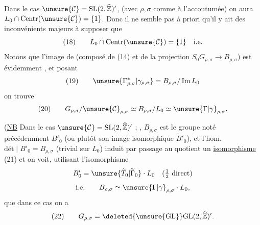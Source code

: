 Dans le cas $\unsure{\mathcal{C}}=\mathrm{SL}(2,\widehat{\mathbb Z})'$, (avec $\rho,\sigma$ comme à l'accoutumée) on aura $L_0\cap\mathrm{Centr}(\unsure{\mathcal{C}})=\{1\}$. Donc il ne semble pas à priori qu'il y ait des inconvénients majeurs à supposer que
\[
(18)\qquad L_0\cap\mathrm{Centr}(\unsure{\mathcal{C}})=\{1\}\quad\text{i.e.}
\]
Notons que  l'image de
(composé de (14) et de la projection $S_0G_{\rho,\sigma}\longrightarrow B_{\rho,\sigma}$) est évidemment , et posant
\[
(19)\qquad\unsure{\Gamma_{\rho,\sigma}^{*}|\gamma_{\rho,\sigma}}=B_{\rho,\sigma}/\operatorname{Im}L_0
\]
on trouve
\[
(20)\qquad G_{\rho,\sigma}/\unsure{\mathcal{C}}_{\rho,\sigma}\simeq B_{\rho,\sigma}/L_0\simeq\unsure{\Gamma|\gamma}_{\rho,\sigma}.
\]

(\uline{NB} Dans le cas $\unsure{\mathcal{C}}=\mathrm{SL}(2,\widehat{\mathbb Z})'$ ;  , $B_{\rho,\sigma}$  est le groupe noté précédemment $B'_0$ (ou plutôt son image isomorphique $\widetilde B'_0$), et l'hom. $\mathrm{dét}\mid B'_0=B_{\rho,\sigma}$  (trivial sur $L_0$) induit par passage au quotient un \uline{isomorphisme}
\hfill(21)
et on voit,  utilisant l'isomorphisme
\[
B'_0=\unsure{\widetilde T_0|\widetilde\Gamma_0}\cdot L_0\quad(\tfrac12\text{ direct})
\]
\[
\text{i.e.}\qquad B_{\rho,\sigma}\simeq\unsure{\Gamma|\gamma}_{\rho,\sigma}\cdot L_0,
\]
que dans ce cas on a
\[
(22)\qquad G_{\rho,\sigma}=\deleted{\unsure{\mathrm{GL}}}\mathrm{GL}(2,\widehat{\mathbb Z})'.
\]

